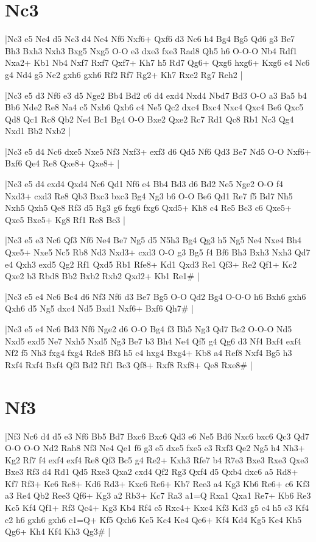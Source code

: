 \section{Nc3}

\whitename{}
\blackname{}
\makegametitle
|Nc3 e5 Ne4 d5 Nc3 d4 Ne4 Nf6 Nxf6+ Qxf6 d3 Nc6 h4 Bg4 Bg5 Qd6 g3 Be7 Bh3 Bxh3 Nxh3 Bxg5 Nxg5 O-O e3 dxe3 fxe3 Rad8 Qh5 h6 O-O-O Nb4 Rdf1 Nxa2+ Kb1 Nb4 Nxf7 Rxf7 Qxf7+ Kh7 h5 Rd7 Qg6+ Qxg6 hxg6+ Kxg6 e4 Nc6 g4 Nd4 g5 Ne2 gxh6 gxh6 Rf2 Rf7 Rg2+ Kh7 Rxe2 Rg7 Reh2  |

\whitename{}
\blackname{}
\makegametitle
|Nc3 e5 d3 Nf6 e3 d5 Nge2 Bb4 Bd2 c6 d4 exd4 Nxd4 Nbd7 Bd3 O-O a3 Ba5 b4 Bb6 Nde2 Re8 Na4 c5 Nxb6 Qxb6 c4 Ne5 Qc2 dxc4 Bxc4 Nxc4 Qxc4 Be6 Qxc5 Qd8 Qc1 Rc8 Qb2 Ne4 Bc1 Bg4 O-O Bxe2 Qxe2 Rc7 Rd1 Qc8 Rb1 Nc3 Qg4 Nxd1 Bb2 Nxb2  |

\whitename{}
\blackname{}
\makegametitle
|Nc3 e5 d4 Nc6 dxe5 Nxe5 Nf3 Nxf3+ exf3 d6 Qd5 Nf6 Qd3 Be7 Nd5 O-O Nxf6+ Bxf6 Qe4 Re8 Qxe8+ Qxe8+  |

\whitename{}
\blackname{}
\makegametitle
|Nc3 e5 d4 exd4 Qxd4 Nc6 Qd1 Nf6 e4 Bb4 Bd3 d6 Bd2 Ne5 Nge2 O-O f4 Nxd3+ cxd3 Re8 Qb3 Bxc3 bxc3 Bg4 Ng3 b6 O-O Be6 Qd1 Re7 f5 Bd7 Nh5 Nxh5 Qxh5 Qe8 Rf3 d5 Rg3 g6 fxg6 fxg6 Qxd5+ Kh8 c4 Re5 Bc3 c6 Qxe5+ Qxe5 Bxe5+ Kg8 Rf1 Re8 Bc3  |

\whitename{}
\blackname{}
\makegametitle
|Nc3 e5 e3 Nc6 Qf3 Nf6 Ne4 Be7 Ng5 d5 N5h3 Bg4 Qg3 h5 Ng5 Ne4 Nxe4 Bh4 Qxe5+ Nxe5 Nc5 Rb8 Nd3 Nxd3+ cxd3 O-O g3 Bg5 f4 Bf6 Bh3 Bxh3 Nxh3 Qd7 e4 Qxh3 exd5 Qg2 Rf1 Qxd5 Rb1 Rfe8+ Kd1 Qxd3 Re1 Qf3+ Re2 Qf1+ Kc2 Qxe2 b3 Rbd8 Bb2 Bxb2 Rxb2 Qxd2+ Kb1 Re1\#  |

\whitename{}
\blackname{}
\makegametitle
|Nc3 e5 e4 Nc6 Bc4 d6 Nf3 Nf6 d3 Be7 Bg5 O-O Qd2 Bg4 O-O-O h6 Bxh6 gxh6 Qxh6 d5 Ng5 dxc4 Nd5 Bxd1 Nxf6+ Bxf6 Qh7\#  |

\whitename{}
\blackname{}
\makegametitle
|Nc3 e5 e4 Nc6 Bd3 Nf6 Nge2 d6 O-O Bg4 f3 Bh5 Ng3 Qd7 Be2 O-O-O Nd5 Nxd5 exd5 Ne7 Nxh5 Nxd5 Ng3 Be7 b3 Bh4 Ne4 Qf5 g4 Qg6 d3 Nf4 Bxf4 exf4 Nf2 f5 Nh3 fxg4 fxg4 Rde8 Bf3 h5 c4 hxg4 Bxg4+ Kb8 a4 Ref8 Nxf4 Bg5 h3 Rxf4 Rxf4 Bxf4 Qf3 Bd2 Rf1 Bc3 Qf8+ Rxf8 Rxf8+ Qe8 Rxe8\#  |

\section{Nf3}

\whitename{}
\blackname{}
\makegametitle
|Nf3 Nc6 d4 d5 e3 Nf6 Bb5 Bd7 Bxc6 Bxc6 Qd3 e6 Ne5 Bd6 Nxc6 bxc6 Qc3 Qd7 O-O O-O Nd2 Rab8 Nf3 Ne4 Qe1 f6 g3 e5 dxe5 fxe5 c3 Rxf3 Qe2 Ng5 h4 Nh3+ Kg2 Rf7 f4 exf4 exf4 Re8 Qf3 Bc5 g4 Re2+ Kxh3 Rfe7 b4 R7e3 Bxe3 Rxe3 Qxe3 Bxe3 Rf3 d4 Rd1 Qd5 Rxe3 Qxa2 cxd4 Qf2 Rg3 Qxf4 d5 Qxb4 dxc6 a5 Rd8+ Kf7 Rf3+ Ke6 Re8+ Kd6 Rd3+ Kxc6 Re6+ Kb7 Ree3 a4 Kg3 Kb6 Re6+ c6 Kf3 a3 Re4 Qb2 Ree3 Qf6+ Kg3 a2 Rb3+ Kc7 Ra3 a1=Q Rxa1 Qxa1 Re7+ Kb6 Re3 Kc5 Kf4 Qf1+ Rf3 Qc4+ Kg3 Kb4 Rf4 c5 Rxc4+ Kxc4 Kf3 Kd3 g5 c4 h5 c3 Kf4 c2 h6 gxh6 gxh6 c1=Q+ Kf5 Qxh6 Ke5 Kc4 Ke4 Qe6+ Kf4 Kd4 Kg5 Ke4 Kh5 Qg6+ Kh4 Kf4 Kh3 Qg3\#  |

